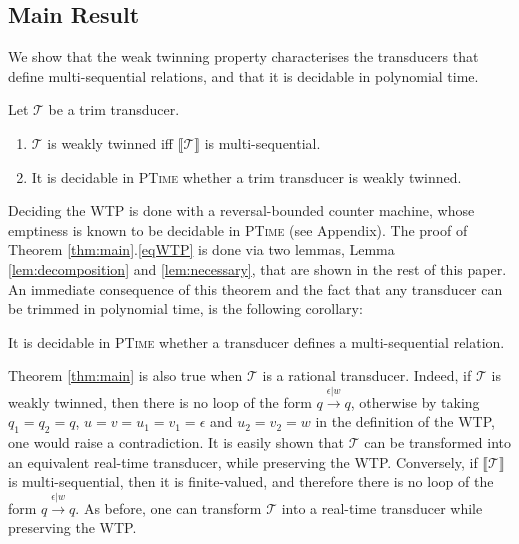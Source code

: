 \documentclass[envcountsame]{llncs}
\newcommand\inter[1]{\llbracket #1 \rrbracket}
\newcommand\tra{\mathcal{T}}
\begin{document}
\vspace{-6mm} 
\subsection{Main Result}
\vspace{-2mm}

We show that the weak twinning property characterises the
transducers that define multi-sequential relations, and that it is
decidable in polynomial time. 

\vspace{-1mm}
\begin{theorem}\label{thm:main}
    Let $\tra$ be a trim transducer. 
\vspace{-1mm}
\begin{enumerate}
\item\label{eqWTP} $\tra$ is weakly twinned iff $\inter{\tra}$ is
  multi-sequential. 
\item\label{decWTP} It is decidable in \textsc{PTime} whether a trim
  transducer is weakly twinned. 
\end{enumerate}
\end{theorem}

Deciding the WTP is done with a reversal-bounded counter machine,
whose emptiness is known to be decidable in \textsc{PTime} \cite{JACM::Ibarra1978}
(see Appendix). The proof of Theorem
\ref{thm:main}.\ref{eqWTP} is done via two lemmas, Lemma
\ref{lem:decomposition} and \ref{lem:necessary}, that are shown in the
rest of this paper. An immediate consequence of this theorem and the
fact that any transducer can be trimmed
in polynomial time, is the following corollary:
\vspace{-1mm}
\begin{corollary}
    It is decidable in \textsc{PTime} whether a transducer defines a
    multi-sequential relation. 
\end{corollary}


\begin{remark}\label{rm:realtime} Theorem \ref{thm:main} is also true
    when $\tra$ is a rational transducer. Indeed, if $\tra$ is weakly twinned,
    then there is no loop of the form $q\xrightarrow{\epsilon|w}q$, otherwise by taking $q_1 = q_2 = q$,
    $u=v=u_1=v_1=\epsilon$ and $u_2 = v_2 = w$ in the definition of
    the WTP, one would raise a contradiction. It is easily shown that
    $\tra$ can be transformed into an equivalent real-time transducer,
    while preserving the WTP. Conversely, if $\inter{\tra}$ is
    multi-sequential, then it is finite-valued, and therefore there is
    no loop of the form $q\xrightarrow{\epsilon|w}q$. As before, one can transform $\tra$ into a real-time
    transducer while preserving the WTP. 
\end{remark}
\end{document}
